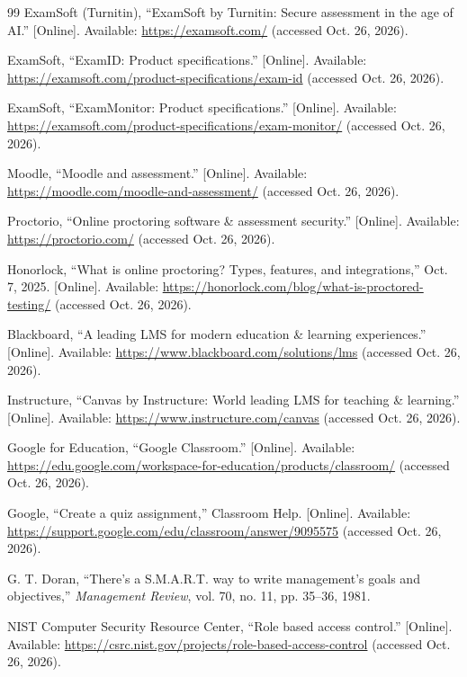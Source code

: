 \begin{thebibliography}{99}
 ExamSoft (Turnitin), ``ExamSoft by Turnitin: Secure assessment in the age of AI.'' [Online]. Available: \url{https://examsoft.com/} (accessed Oct. 26, 2026).

 ExamSoft, ``ExamID: Product specifications.'' [Online]. Available: \url{https://examsoft.com/product-specifications/exam-id} (accessed Oct. 26, 2026).

 ExamSoft, ``ExamMonitor: Product specifications.'' [Online]. Available: \url{https://examsoft.com/product-specifications/exam-monitor/} (accessed Oct. 26, 2026).

 Moodle, ``Moodle and assessment.'' [Online]. Available: \url{https://moodle.com/moodle-and-assessment/} (accessed Oct. 26, 2026).

 Proctorio, ``Online proctoring software \& assessment security.'' [Online]. Available: \url{https://proctorio.com/} (accessed Oct. 26, 2026).

 Honorlock, ``What is online proctoring? Types, features, and integrations,'' Oct. 7, 2025. [Online]. Available: \url{https://honorlock.com/blog/what-is-proctored-testing/} (accessed Oct. 26, 2026).

 Blackboard, ``A leading LMS for modern education \& learning experiences.'' [Online]. Available: \url{https://www.blackboard.com/solutions/lms} (accessed Oct. 26, 2026).

 Instructure, ``Canvas by Instructure: World leading LMS for teaching \& learning.'' [Online]. Available: \url{https://www.instructure.com/canvas} (accessed Oct. 26, 2026).

 Google for Education, ``Google Classroom.'' [Online]. Available: \url{https://edu.google.com/workspace-for-education/products/classroom/} (accessed Oct. 26, 2026).

 Google, ``Create a quiz assignment,'' Classroom Help. [Online]. Available: \url{https://support.google.com/edu/classroom/answer/9095575} (accessed Oct. 26, 2026).

 G. T. Doran, ``There's a S.M.A.R.T. way to write management's goals and objectives,'' \textit{Management Review}, vol. 70, no. 11, pp. 35--36, 1981.

 NIST Computer Security Resource Center, ``Role based access control.'' [Online]. Available: \url{https://csrc.nist.gov/projects/role-based-access-control} (accessed Oct. 26, 2026).


\end{thebibliography}
